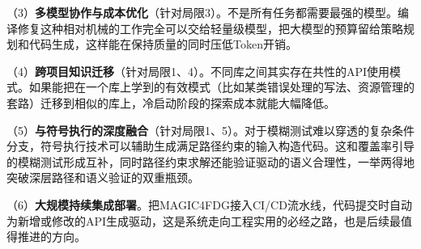 （3）\textbf{多模型协作与成本优化}（针对局限3）。不是所有任务都需要最强的模型。编译修复这种相对机械的工作完全可以交给轻量级模型，把大模型的预算留给策略规划和代码生成，这样能在保持质量的同时压低Token开销。

（4）\textbf{跨项目知识迁移}（针对局限1、4）。不同库之间其实存在共性的API使用模式。如果能把在一个库上学到的有效模式（比如某类错误处理的写法、资源管理的套路）迁移到相似的库上，冷启动阶段的探索成本就能大幅降低。

（5）\textbf{与符号执行的深度融合}（针对局限1、5）。对于模糊测试难以穿透的复杂条件分支，符号执行技术\cite{cadar2008}可以辅助生成满足路径约束的输入构造代码。这和覆盖率引导的模糊测试形成互补，同时路径约束求解还能验证驱动的语义合理性，一举两得地突破深层路径和语义验证的双重瓶颈。

（6）\textbf{大规模持续集成部署}。把MAGIC4FDG接入CI/CD流水线，代码提交时自动为新增或修改的API生成驱动，这是系统走向工程实用的必经之路，也是后续最值得推进的方向。
